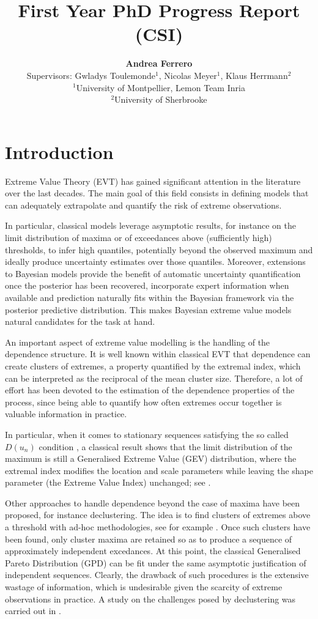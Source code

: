 \documentclass[11pt, a4paper]{article}
\title{\textbf{First Year PhD Progress Report (CSI)}}
\author{\textbf{Andrea Ferrero} \\ 
    \small Supervisors: Gwladys Toulemonde$^1$, Nicolas Meyer$^1$, Klaus Herrmann$^2$ \\
    \small $^1$University of Montpellier, Lemon Team Inria \\
    \small $^2$University of Sherbrooke}
\date{}
\begin{document}
\maketitle

\section{Introduction}

Extreme Value Theory (EVT) has gained significant attention in the literature over the last decades. The main goal of this field consists in defining models that can adequately extrapolate and quantify the risk of extreme observations.

In particular, classical models leverage asymptotic results, for instance on the limit distribution of maxima or of exceedances above (sufficiently high) thresholds, to infer high quantiles, potentially beyond the observed maximum and ideally produce uncertainty estimates over those quantiles. Moreover, extensions to Bayesian models provide the benefit of automatic uncertainty quantification once the posterior has been recovered, incorporate expert information when available \parencite{coles1996} and prediction naturally fits within the Bayesian framework via the posterior predictive distribution. This makes Bayesian extreme value models natural candidates for the task at hand.

An important aspect of extreme value modelling is the handling of the dependence structure. It is well known within classical EVT that dependence can create clusters of extremes, a property quantified by the extremal index, which can be interpreted as the reciprocal of the mean cluster size. Therefore, a lot of effort has been devoted to the estimation of the dependence properties of the process, since being able to quantify how often extremes occur together is valuable information in practice.

In particular, when it comes to stationary sequences satisfying the so called $D(u_n)$ condition \parencite{leadbetter1974}, a classical result shows that the limit distribution of the maximum is still a Generalised Extreme Value (GEV) distribution, where the extremal index modifies the location and scale parameters while leaving the shape parameter (the Extreme Value Index) unchanged; see \textcite[Chapter 5]{coles2001}.

Other approaches to handle dependence beyond the case of maxima have been proposed, for instance declustering. The idea is to find clusters of extremes above a threshold with ad-hoc methodologies, see for example \textcite{ferro2003}. Once such clusters have been found, only cluster maxima are retained so as to produce a sequence of approximately independent excedances. At this point, the classical Generalised Pareto Distribution (GPD) can be fit under the same asymptotic justification of independent sequences. Clearly, the drawback of such procedures is the extensive wastage of information, which is undesirable given the scarcity of extreme observations in practice. A study on the challenges posed by declustering was carried out in \textcite{fawcett2007}.
\end{document}

